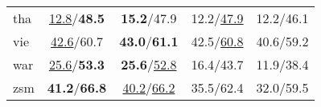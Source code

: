 \begin{table}[ht]
\begin{subtable}[t]{\textwidth}
{\begin{tabular}{lcccc}
            tha  & \underline{12.8}/\textbf{48.5} & \textbf{15.2}/47.9 & 12.2/\underline{47.9} & 12.2/46.1 \\
            vie  & \underline{42.6}/60.7 & \textbf{43.0}/\textbf{61.1} & 42.5/\underline{60.8} & 40.6/59.2 \\
            war  & \underline{25.6}/\textbf{53.3} & \textbf{25.6}/\underline{52.8} & 16.4/43.7 & 11.9/38.4 \\
            zsm  & \textbf{41.2}/\textbf{66.8} & \underline{40.2}/\underline{66.2} & 35.5/62.4 & 32.0/59.5 \\
            \bottomrule
        \end{tabular}%
        }
    \end{subtable}
    
    \vspace{1em} %
    

\end{table}
